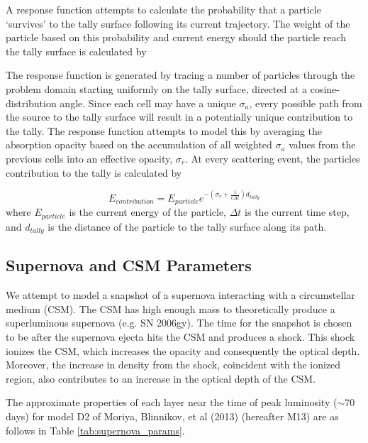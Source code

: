 \documentclass[]{article}
\begin{document}
		A response function attempts to calculate the probability that a particle `survives' to the tally surface following its current trajectory. The weight of the particle based on this probability and current energy should the particle reach the tally surface is calculated by

		The response function is generated by tracing a number of particles through the problem domain starting uniformly on the tally surface, directed at a cosine-distribution angle. Since each cell may have a unique $\sigma_{a}$, every possible path from the source to the tally surface will result in a potentially unique contribution to the tally. The response function attempts to model this by averaging the absorption opacity based on the accumulation of all weighted $\sigma_{a}$ values from the previous cells into an effective opacity, $\sigma_{r}$. At every scattering event, the particles contribution to the tally is calculated by

		\begin{equation}\label{Eq: tally_contr}
		E_{contribution} = E_{particle}e^{-(\sigma_{r} + \frac{1}{c \Delta t})d_{tally}}
		\end{equation}
		where $E_{particle}$ is the current energy of the particle, $\Delta t$ is the current time step, and $d_{tally}$ is the distance of the particle to the tally surface along its path.

	\subsection{Supernova and CSM Parameters} \label{sec:sncsmpars}
		We attempt to model a snapshot of a supernova interacting with a circumstellar medium (CSM). The CSM has high enough mass to theoretically produce a superluminous supernova (e.g. SN 2006gy). The time for the snapshot is chosen to be after the supernova ejecta hits the CSM and produces a shock. This shock ionizes the CSM, which increases the opacity and consequently the optical depth. Moreover, the increase in density from the shock, coincident with the ionized region, also contributes to an increase in the optical depth of the CSM.

		The approximate properties of each layer near the time of peak luminosity ($\sim70$ days) for model D2 of Moriya, Blinnikov, et al (2013) (hereafter M13) are as follows in Table \ref{tab:supernova_params}.
\end{document}
